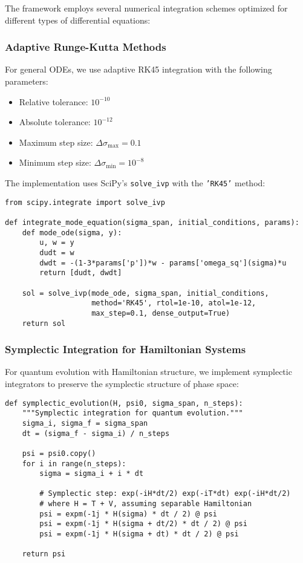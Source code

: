 The framework employs several numerical integration schemes optimized for different types of differential equations:

\subsubsection{Adaptive Runge-Kutta Methods}

For general ODEs, we use adaptive RK45 integration with the following parameters:
\begin{itemize}
\item Relative tolerance: $10^{-10}$
\item Absolute tolerance: $10^{-12}$
\item Maximum step size: $\Delta\sigma_{\max} = 0.1$
\item Minimum step size: $\Delta\sigma_{\min} = 10^{-8}$
\end{itemize}

The implementation uses SciPy's \texttt{solve\_ivp} with the \texttt{'RK45'} method:

\begin{verbatim}
from scipy.integrate import solve_ivp

def integrate_mode_equation(sigma_span, initial_conditions, params):
    def mode_ode(sigma, y):
        u, w = y
        dudt = w
        dwdt = -(1-3*params['p'])*w - params['omega_sq'](sigma)*u
        return [dudt, dwdt]
    
    sol = solve_ivp(mode_ode, sigma_span, initial_conditions,
                    method='RK45', rtol=1e-10, atol=1e-12,
                    max_step=0.1, dense_output=True)
    return sol
\end{verbatim}

\subsubsection{Symplectic Integration for Hamiltonian Systems}

For quantum evolution with Hamiltonian structure, we implement symplectic integrators to preserve the symplectic structure of phase space:

\begin{verbatim}
def symplectic_evolution(H, psi0, sigma_span, n_steps):
    """Symplectic integration for quantum evolution."""
    sigma_i, sigma_f = sigma_span
    dt = (sigma_f - sigma_i) / n_steps
    
    psi = psi0.copy()
    for i in range(n_steps):
        sigma = sigma_i + i * dt
        
        # Symplectic step: exp(-iH*dt/2) exp(-iT*dt) exp(-iH*dt/2)
        # where H = T + V, assuming separable Hamiltonian
        psi = expm(-1j * H(sigma) * dt / 2) @ psi
        psi = expm(-1j * H(sigma + dt/2) * dt / 2) @ psi
        psi = expm(-1j * H(sigma + dt) * dt / 2) @ psi
    
    return psi
\end{verbatim}

